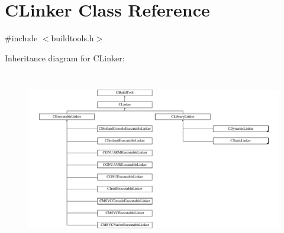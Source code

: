 \hypertarget{classCLinker}{\section{C\-Linker Class Reference}
\label{classCLinker}
}


{\ttfamily \#include $<$buildtools.\-h$>$}

Inheritance diagram for C\-Linker\-:\begin{figure}[H]
\begin{center}
\leavevmode
\includegraphics[height=7.777778cm]{dd/d01/classCLinker}
\end{center}
\end{figure}
